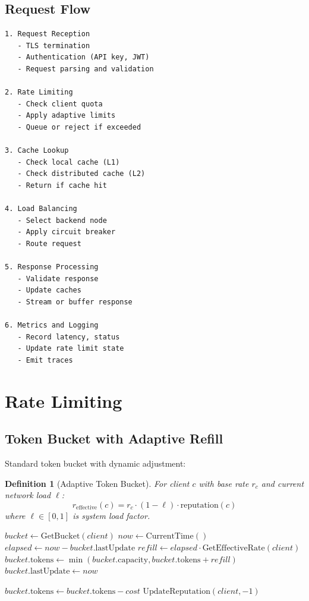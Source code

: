 \documentclass[11pt,a4paper]{article}
\newtheorem{definition}{Definition}
\begin{document}
\subsection{Request Flow}

\begin{lstlisting}
1. Request Reception
   - TLS termination
   - Authentication (API key, JWT)
   - Request parsing and validation

2. Rate Limiting
   - Check client quota
   - Apply adaptive limits
   - Queue or reject if exceeded

3. Cache Lookup
   - Check local cache (L1)
   - Check distributed cache (L2)
   - Return if cache hit

4. Load Balancing
   - Select backend node
   - Apply circuit breaker
   - Route request

5. Response Processing
   - Validate response
   - Update caches
   - Stream or buffer response

6. Metrics and Logging
   - Record latency, status
   - Update rate limit state
   - Emit traces
\end{lstlisting}

\section{Rate Limiting}

\subsection{Token Bucket with Adaptive Refill}

Standard token bucket with dynamic adjustment:

\begin{definition}[Adaptive Token Bucket]
For client $c$ with base rate $r_c$ and current network load $\ell$:
\[
r_{\text{effective}}(c) = r_c \cdot (1 - \ell) \cdot \text{reputation}(c)
\]
where $\ell \in [0, 1]$ is system load factor.
\end{definition}

\begin{algorithm}
\caption{Adaptive Rate Limiter}
\begin{algorithmic}[1]
    \State $bucket \gets \text{GetBucket}(client)$
    \State $now \gets \text{CurrentTime}()$
    \State $elapsed \gets now - bucket.\text{lastUpdate}$
    \State $refill \gets elapsed \cdot \text{GetEffectiveRate}(client)$
    \State $bucket.\text{tokens} \gets \min(bucket.\text{capacity}, bucket.\text{tokens} + refill)$
    \State $bucket.\text{lastUpdate} \gets now$

        \State $bucket.\text{tokens} \gets bucket.\text{tokens} - cost$
        \Return {}
    \Else
        \State $\text{UpdateReputation}(client, -1)$
        \Return {}
    \EndIf
\EndProcedure
\end{algorithmic}
\end{algorithm}
\end{document}

